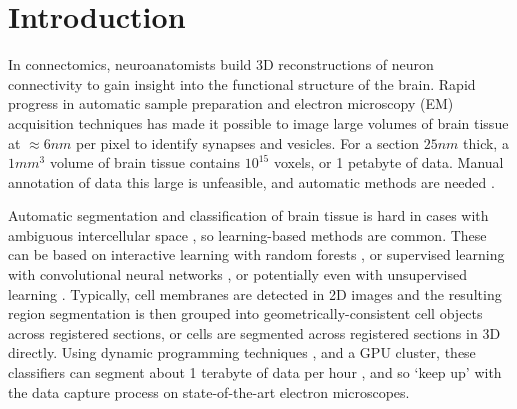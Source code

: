 \section{Introduction}


In connectomics, neuroanatomists build 3D reconstructions of neuron connectivity to gain insight into the functional structure of the brain. Rapid progress in automatic sample preparation and electron microscopy (EM) acquisition techniques has made it possible to image large volumes of brain tissue at $\approx6nm$ per pixel to identify synapses and vesicles. For a section $25nm$ thick, a $1 mm^3$ volume of brain tissue contains $10^{15}$ voxels, or 1 petabyte of data. Manual annotation of data this large is unfeasible, and automatic methods are needed \cite{jain2010,kaynig13,Liu2014,NunezIglesias2013Machine,GALA2014,amelio_segmentation}.

Automatic segmentation and classification of brain tissue is hard in cases with ambiguous intercellular space \cite{isbi_challenge}, so learning-based methods are common. These can be based on interactive learning with random forests \cite{Sommer2011Ilastik,kaynig2015large}, or supervised learning with convolutional neural networks \cite{Ciresan:2012f,RonnebergerFB15,lee2015recursive}, or potentially even with unsupervised learning \cite{BogovicHJ13}. Typically, cell membranes are detected in 2D images and the resulting region segmentation is then grouped into geometrically-consistent cell objects across registered sections, or cells are segmented across registered sections in 3D directly. Using dynamic programming techniques \cite{Masci:2013a}, and a GPU cluster, these classifiers can segment about 1 terabyte of data per hour \cite{kasthuri2015saturated}, and so `keep up' with the data capture process on state-of-the-art electron microscopes.


